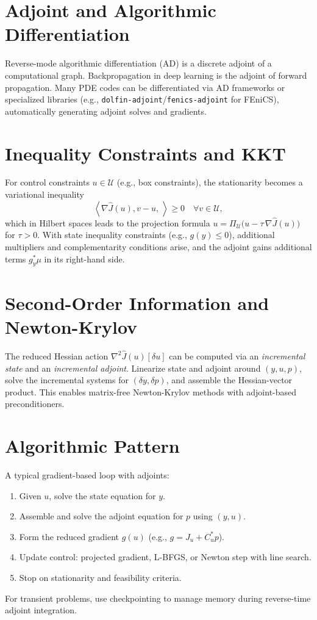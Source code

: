\documentclass[11pt,a4paper]{article}
\numberwithin{equation}{section}
\theoremstyle{plain}
\theoremstyle{definition}
\newcommand{\ip}[2]{\left\langle #1,\,#2 \right\rangle}
\begin{document}
\section{Adjoint and Algorithmic Differentiation}
Reverse-mode algorithmic differentiation (AD) is a discrete adjoint of a computational graph. Backpropagation in deep learning is the adjoint of forward propagation. Many PDE codes can be differentiated via AD frameworks or specialized libraries (e.g., \texttt{dolfin-adjoint}/\texttt{fenics-adjoint} for FEniCS), automatically generating adjoint solves and gradients.

\section{Inequality Constraints and KKT}
\label{sec:constraints}
For control constraints $u\in \mathcal U$ (e.g., box constraints), the stationarity becomes a variational inequality
\begin{equation}
\ip{\nabla \hat J(u), v-u}{} \ge 0 \quad \forall v\in\mathcal U,
\end{equation}
which in Hilbert spaces leads to the projection formula $u=\Pi_{\mathcal U}\big(u-\tau\,\nabla \hat J(u)\big)$ for $\tau>0$. With state inequality constraints (e.g., $g(y)\le 0$), additional multipliers and complementarity conditions arise, and the adjoint gains additional terms $g_y^\ast \mu$ in its right-hand side.

\section{Second-Order Information and Newton-Krylov}
The reduced Hessian action $\nabla^2 \hat J(u)[\delta u]$ can be computed via an \emph{incremental state} and an \emph{incremental adjoint}. Linearize state and adjoint around $(y,u,p)$, solve the incremental systems for $(\delta y, \delta p)$, and assemble the Hessian-vector product. This enables matrix-free Newton-Krylov methods with adjoint-based preconditioners.

\section{Algorithmic Pattern}
A typical gradient-based loop with adjoints:
\begin{enumerate}
  \item Given $u$, solve the state equation for $y$.
  \item Assemble and solve the adjoint equation for $p$ using $(y,u)$.
  \item Form the reduced gradient $g(u)$ (e.g., $g=J_u + C_u^\ast p$).
  \item Update control: projected gradient, L-BFGS, or Newton step with line search.
  \item Stop on stationarity and feasibility criteria.
\end{enumerate}
For transient problems, use checkpointing to manage memory during reverse-time adjoint integration.
\end{document}

